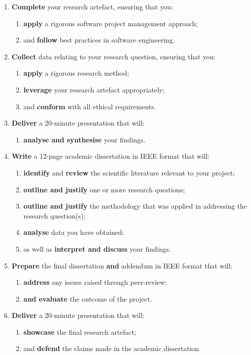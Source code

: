 \documentclass{../fal_assignment}
\begin{document}
\begin{enumerate}[label=(\Alph*)]
	\item \textbf{Complete} your research artefact, ensuring that you:
		\begin{enumerate}[label=(\roman*)]
			\item \textbf{apply} a rigorous software project management approach;
			\item and \textbf{follow} best practices in software engineering.
		\end{enumerate}
	\item \textbf{Collect} data relating to your research question,
		ensuring that you:
		\begin{enumerate}[label=(\roman*)]
			\item \textbf{apply} a rigorous research method;
			\item \textbf{leverage} your research artefact appropriately;
			\item and \textbf{conform} with all ethical requirements.
		\end{enumerate}
	\item \textbf{Deliver} a 20-minute presentation that will:
		\begin{enumerate}[label=(\roman*)]
			\item \textbf{analyse and synthesise} your findings.
		\end{enumerate}
	\item \label{part:review-draft} \textbf{Write} a 12-page academic dissertation in IEEE format
		that will:
		\begin{enumerate}[label=(\roman*)]
			\item \textbf{identify} and \textbf{review} the scientific literature relevant to your project;
			\item \textbf{outline and justify} one or more research questions;
			\item \textbf{outline and justify} the methodology that was applied in addressing the research question(s);
			\item \textbf{analyse} data you have obtained;
			\item as well as \textbf{interpret and discuss} your findings.
		\end{enumerate}
	\item \textbf{Prepare} the final dissertation \textbf{and} addendum in IEEE format that will:
		\begin{enumerate}[label=(\roman*)]
			\item \textbf{address} any issues raised through peer-review;
			\item \textbf{and evaluate} the outcome of the project.
		\end{enumerate}
	\item \textbf{Deliver} a 20-minute presentation that will:
		\begin{enumerate}[label=(\roman*)]
			\item \textbf{showcase} the final research artefact;
			\item and \textbf{defend} the claims made in the academic dissertation.
		\end{enumerate}
\end{enumerate}
\end{document}
